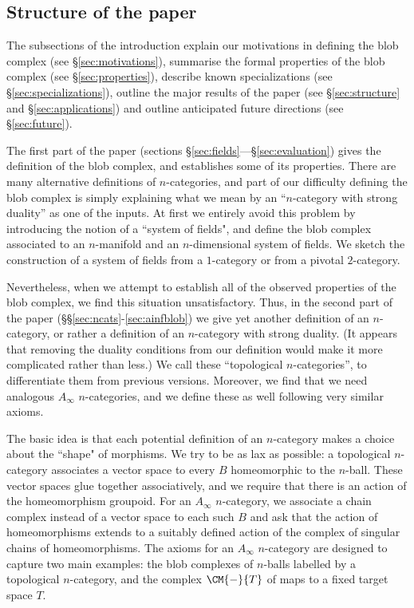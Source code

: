 \subsection{Structure of the paper}
The subsections of the introduction explain our motivations in defining the blob complex (see \S \ref{sec:motivations}), 
summarise the formal properties of the blob complex (see \S \ref{sec:properties}), describe known specializations (see \S \ref{sec:specializations}), outline the major results of the paper (see \S \ref{sec:structure} and \S \ref{sec:applications})
and outline anticipated future directions (see \S \ref{sec:future}).

The first part of the paper (sections \S \ref{sec:fields}---\S \ref{sec:evaluation}) gives the definition of the blob complex, 
and establishes some of its properties.
There are many alternative definitions of $n$-categories, and part of our difficulty defining the blob complex is 
simply explaining what we mean by an ``$n$-category with strong duality'' as one of the inputs.
At first we entirely avoid this problem by introducing the notion of a ``system of fields", and define the blob complex 
associated to an $n$-manifold and an $n$-dimensional system of fields.
We sketch the construction of a system of fields from a $1$-category or from a pivotal $2$-category.

Nevertheless, when we attempt to establish all of the observed properties of the blob complex, 
we find this situation unsatisfactory.
Thus, in the second part of the paper (\S\S \ref{sec:ncats}-\ref{sec:ainfblob}) we give yet another 
definition of an $n$-category, or rather a definition of an $n$-category with strong duality.
(It appears that removing the duality conditions from our definition would make it more complicated rather than less.) 
We call these ``topological $n$-categories'', to differentiate them from previous versions.
Moreover, we find that we need analogous $A_\infty$ $n$-categories, and we define these as well following very similar axioms.

The basic idea is that each potential definition of an $n$-category makes a choice about the ``shape" of morphisms.
We try to be as lax as possible: a topological $n$-category associates a vector space to every $B$ homeomorphic to the $n$-ball.
These vector spaces glue together associatively, and we require that there is an action of the homeomorphism groupoid.
For an $A_\infty$ $n$-category, we associate a chain complex instead of a vector space to each such $B$ and ask that the action of 
homeomorphisms extends to a suitably defined action of the complex of singular chains of homeomorphisms.
The axioms for an $A_\infty$ $n$-category are designed to capture two main examples: the blob complexes of $n$-balls labelled by a 
topological $n$-category, and the complex $\CM{-}{T}$ of maps to a fixed target space $T$.

